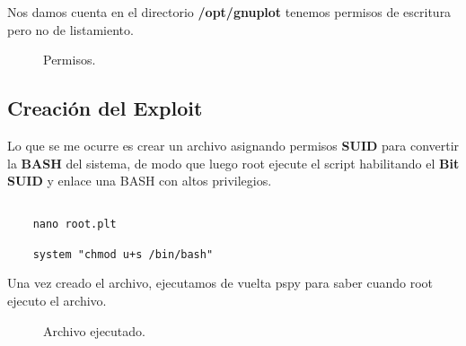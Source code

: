 \documentclass[a4paper]{article} %
\begin{document}
    Nos damos cuenta en el directorio \textbf{/opt/gnuplot} tenemos permisos de escritura pero no de listamiento.

    \begin{figure}[h] %
        \begin{center}
        \setlength{\fboxsep}{0.2em} %
        \end{center}
        \captionsetup{labelfont=bf} %
        \caption{Permisos.}
    \end{figure}

    \vspace{9cm}

    \subsection{Creación del Exploit}

    \vspace{0.2cm}

    Lo que se me ocurre es crear un archivo asignando permisos \textbf{SUID} para convertir la \textbf{BASH} del sistema, de modo que luego root ejecute el script habilitando el \textbf{Bit SUID} y enlace una BASH con altos privilegios.

    \captionsetup[lstlisting]{labelfont=bf} %
    \begin{lstlisting}[caption=Exploit., aboveskip=0.5cm]
        
    nano root.plt
          
    system "chmod u+s /bin/bash"
    \end{lstlisting}

    Una vez creado el archivo, ejecutamos de vuelta pspy para saber cuando root ejecuto el archivo.

    \begin{figure}[h] %
        \begin{center}
        \setlength{\fboxsep}{0.2em} %
        \end{center}
        \captionsetup{labelfont=bf} %
        \caption{Archivo ejecutado.}
    \end{figure}
\end{document}
